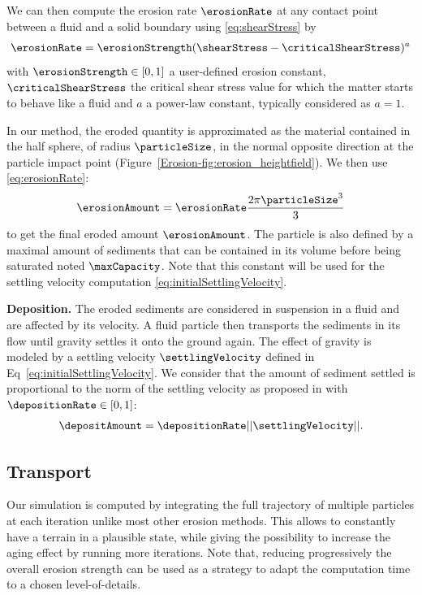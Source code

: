 We can then compute the erosion rate $\erosionRate$ at any contact point between a fluid and a solid boundary using \eqref{eq:shearStress} by 
\begin{align}\label{eq:erosionRate}
\erosionRate = \erosionStrength (\shearStress - \criticalShearStress)^a
\end{align}
with $\erosionStrength\in[0,1]$ a user-defined erosion constant, $\criticalShearStress$ the critical shear stress value for which the matter starts to behave like a fluid and $a$ a power-law constant, typically considered as $a = 1$. 

In our method, the eroded quantity is approximated as the material contained in the half sphere, of radius $\particleSize$, in the normal opposite direction at the particle impact point (Figure~\ref{Erosion-fig:erosion_heightfield}). We then use \eqref{eq:erosionRate}: 
\begin{align}\label{eq:erosionAmount} 
\erosionAmount = \erosionRate \frac{ 2 \pi \particleSize^3 }{ 3 }
\end{align}
to get the final eroded amount $\erosionAmount$. The particle is also defined by a maximal amount of sediments that can be contained in its volume before being saturated noted $\maxCapacity$. Note that this constant will be used for the settling velocity computation \eqref{eq:initialSettlingVelocity}.

\textbf{Deposition.}
The eroded sediments are considered in suspension in a fluid and are affected by its velocity. A fluid particle then transports the sediments in its flow until gravity settles it onto the ground again. The effect of gravity is modeled by a settling velocity $\settlingVelocity$ defined in Eq~\eqref{eq:initialSettlingVelocity}. We consider that the amount of sediment settled is proportional to the norm of the settling velocity as proposed in \cite{Wojtan2007} with $\depositionRate \in [0,1]$: 
\begin{align}\label{eq:deltaDepositon}
\depositAmount = \depositionRate ||\settlingVelocity||.
\end{align}


\subsection{Transport}
Our simulation is computed by integrating the full trajectory of multiple particles at each iteration unlike most other erosion methods. This allows to constantly have a terrain in a plausible state, while giving the possibility to increase the aging effect by running more iterations. 
Note that, reducing progressively the overall erosion strength can be used as a strategy to adapt the computation time to a chosen level-of-details.

